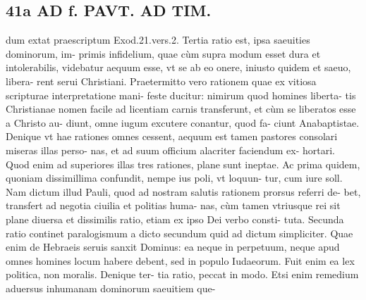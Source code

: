 \documentclass{article}
\begin{document}
\begin{pages}
\section*{41a AD f. PAVT. AD TIM. }\pstart dum extat praescriptum Exod.21.vers.2.  \pend\pstart Tertia ratio est, ipsa saeuities dominorum, im- primis infidelium, quae cùm supra modum esset dura et intolerabilis, videbatur aequum esse, vt se ab eo onere, iniusto quidem et saeuo, libera- rent serui Christiani. Praetermitto vero rationem quae ex vitiosa scripturae interpretatione mani- feste ducitur: nimirum quod homines liberta- tis Christianae nomen facile ad licentiam carnis transferunt, et cùm se liberatos esse a Christo au- diunt, omne iugum excutere conantur, quod fa- ciunt Anabaptistae.  \pend\pstart Denique vt hae rationes omnes cessent, aequum est tamen pastores consolari miseras illas perso- nas, et ad suum officium alacriter faciendum ex- hortari.  \pend\pstart Quod enim ad superiores illas tres rationes, plane sunt ineptae. Ac prima quidem, quoniam dissimillima confundit, nempe ius poli, vt loquun- tur, cum iure soll. Nam dictum illud Pauli, quod ad nostram salutis rationem prorsus referri de- bet, transfert ad negotia ciuilia et politias huma- nas, cùm tamen vtriusque rei sit plane diuersa et dissimilis ratio, etiam ex ipso Dei verbo consti- tuta.  \pend\pstart Secunda ratio continet paralogismum a dicto secundum quid ad dictum simpliciter. Quae enim de Hebraeis seruis sanxit Dominus: ea neque in perpetuum, neque apud omnes homines locum habere debent, sed in populo Iudaeorum. Fuit enim ea lex politica, non moralis. Denique ter- tia ratio, peccat in modo. Etsi enim remedium aduersus inhumanam dominorum saeuitiem que-  \pend

\end{pages}
\end{document}
